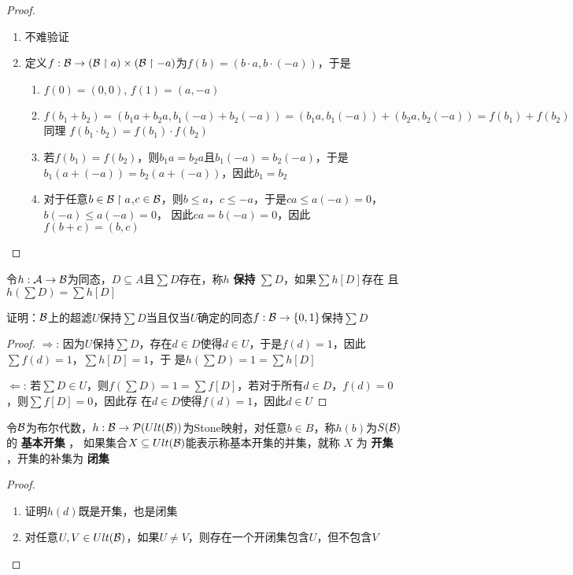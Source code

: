 \documentclass[11pt]{article}
\begin{document}
\begin{proof}
\begin{enumerate}
\item 不难验证
\item 定义\(f:\mathcal{B}\to(\mathcal{B}\upharpoonright a)\times(\mathcal{B}\upharpoonright -a)\)为\(f(b)=(b\cdot a,b\cdot(-a))\)，于是
\begin{enumerate}
\item \(f(0)=(0,0)\), \(f(1)=(a,-a)\)
\item \(f(b_1+b_2)=(b_1a+b_2a,b_1(-a)+b_2(-a))=(b_1a,b_1(-a))+(b_2a,b_2(-a))=f(b_1)+f(b_2)\)
同理
\(f(b_1\cdot b_2)=f(b_1)\cdot f(b_2)\)
\item 若\(f(b_1)=f(b_2)\)，则\(b_1a=b_2a\)且\(b_1(-a)=b_2(-a)\)，于是\(b_1(a+(-a))=b_2(a+(-a))\)，因此\(b_1=b_2\)
\item 对于任意\(b\in\mathcal{B}\upharpoonright a\),\(c\in \mathcal{B}\)，则\(b\le a\)，\(c\le-a\)，于是\(ca\le a(-a)=0\)，\(b(-a)\le a(-a)=0\)，
因此\(ca=b(-a)=0\)，因此\(f(b+c)=(b,c)\)
\end{enumerate}
\end{enumerate}
\end{proof}

\begin{exercise}
令\(h:\mathcal{A}\to\mathcal{B}\)为同态，\(D\subseteq A\)且\(\sum D\)存在，称\(h\) \textbf{保持} \(\sum D\)，如果\(\sum h[D]\)存在
且\(h(\sum D)=\sum h[D]\)

证明：\(\mathcal{B}\)上的超滤\(U\)保持\(\sum D\)当且仅当\(U\)确定的同态\(f:\mathcal{B}\to\{0,1\}\)保持\(\sum D\)
\end{exercise}

\begin{proof}
\(\Rightarrow\): 因为\(U\)保持\(\sum D\)，存在\(d\in D\)使得\(d\in U\)，于是\(f(d)=1\)，因此\(\sum f(d)=1\)，\(\sum h[D]=1\)，于
是\(h(\sum D)=1=\sum h[D]\)

\(\Leftarrow\): 若\(\sum D\in U\)，则\(f(\sum D)=1=\sum f[D]\)，若对于所有\(d\in D\)，\(f(d)=0\)，则\(\sum f[D]=0\)，因此存
在\(d\in D\)使得\(f(d)=1\)，因此\(d\in U\)
\end{proof}

\begin{exercise}
令\(\mathcal{B}\)为布尔代数，\(h:\mathcal{B}\to\mathcal{P}(Ult(\mathcal{B}))\)为Stone映射，对任意\(b\in B\)，称\(h(b)\)为\(S(\mathcal{B})\)的 \textbf{基本开集} ，
如果集合\(X\subseteq Ult(\mathcal{B})\)能表示称基本开集的并集，就称 \(X\) 为 \textbf{开集} ，开集的补集为 \textbf{闭集}
\end{exercise}

\begin{proof}
\begin{enumerate}
\item 证明\(h(d)\)既是开集，也是闭集
\item 对任意\(U,V\in Ult(\mathcal{B})\)，如果\(U\neq V\)，则存在一个开闭集包含\(U\)，但不包含\(V\)
\end{enumerate}
\end{proof}
\end{document}

